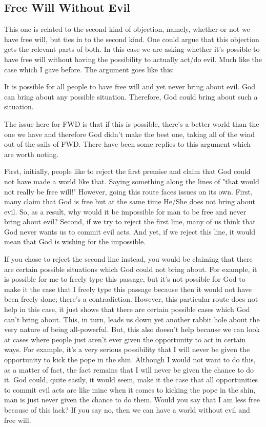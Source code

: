 \subsection{Free Will Without Evil}

This one is related to the second kind of objection, namely, whether or not we have free will, but ties in to the second kind. One could argue that this objection gets the relevant parts of both. In this case we are asking whether it's possible to have free will without having the possibility to actually act/do evil. Much like the case which I gave before. The argument goes like this:

    It is possible for all people to have free will and yet never bring about evil.
    God can bring about any possible situation.
    Therefore, God could bring about such a situation.

The issue here for FWD is that if this is possible, there's a better world than the one we have and therefore God didn't make the best one, taking all of the wind out of the sails of FWD.  There have been some replies to this argument which are worth noting.

First, initially, people like to reject the first premise and claim that God could not have made a world like that. Saying something along the lines of "that would not really be free will!" However, going this route faces issues on its own. First, many claim that God is free but at the same time He/She does not bring about evil. So, as a result, why would it be impossible for man to be free and never bring about evil? Second, if we try to reject the first line, many of us think that God never wants us to commit evil acts. And yet, if we reject this line, it would mean that God is wishing for the impossible.

If you chose to reject the second line instead, you would be claiming that there are certain possible situations which God could not bring about. For example, it is possible for me to freely type this passage, but it's not possible for God to make it the case that I freely type this passage because then it would not have been freely done; there's a contradiction. However, this particular route does not help in this case, it just shows that there are certain possible cases which God can't bring about. This, in turn, leads us down yet another rabbit hole about the very nature of being all-powerful. But, this also doesn't help because we can look at cases where people just aren't ever given the opportunity to act in certain ways. For example, it's a very serious possibility that I will never be given the opportunity to kick the pope in the shin. Although I would not want to do this, as a matter of fact, the fact remains that I will never be given the chance to do it. God could, quite easily, it would seem, make it the case that all opportunities to commit evil acts are like mine when it comes to kicking the pope in the shin, man is just never given the chance to do them. Would you say that I am less free because of this lack? If you say no, then we can have a world without evil and free will.
